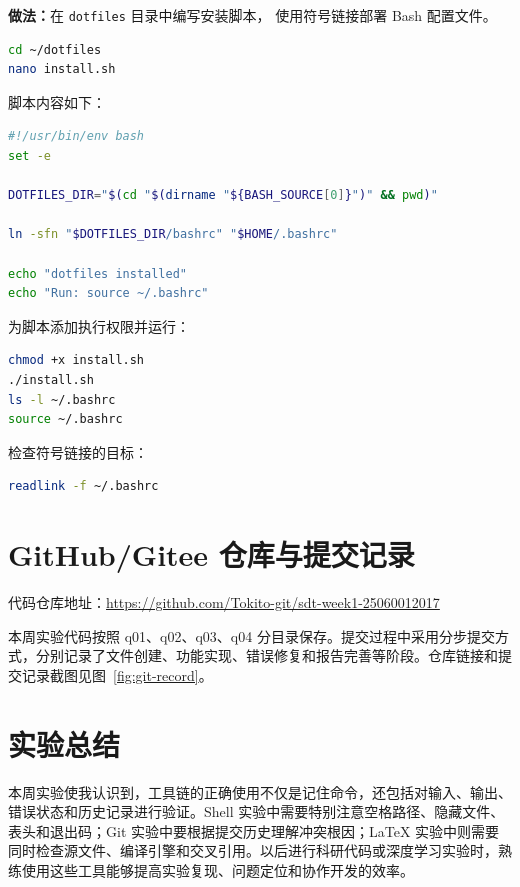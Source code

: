\documentclass[UTF8,12pt,a4paper]{ctexart}
\begin{document}
\textbf{做法：}在 \texttt{dotfiles} 目录中编写安装脚本，
使用符号链接部署 Bash 配置文件。

\begin{lstlisting}[language=bash]
cd ~/dotfiles
nano install.sh
\end{lstlisting}

脚本内容如下：

\begin{lstlisting}[language=bash]
#!/usr/bin/env bash
set -e

DOTFILES_DIR="$(cd "$(dirname "${BASH_SOURCE[0]}")" && pwd)"

ln -sfn "$DOTFILES_DIR/bashrc" "$HOME/.bashrc"

echo "dotfiles installed"
echo "Run: source ~/.bashrc"
\end{lstlisting}

为脚本添加执行权限并运行：

\begin{lstlisting}[language=bash]
chmod +x install.sh
./install.sh
ls -l ~/.bashrc
source ~/.bashrc
\end{lstlisting}

检查符号链接的目标：

\begin{lstlisting}[language=bash]
readlink -f ~/.bashrc
\end{lstlisting}

\section{GitHub/Gitee 仓库与提交记录}

代码仓库地址：\url{https://github.com/Tokito-git/sdt-week1-25060012017}

本周实验代码按照 q01、q02、q03、q04 分目录保存。提交过程中采用分步提交方式，分别记录了文件创建、功能实现、错误修复和报告完善等阶段。仓库链接和提交记录截图见图~\ref{fig:git-record}。


\section{实验总结}

本周实验使我认识到，工具链的正确使用不仅是记住命令，还包括对输入、输出、错误状态和历史记录进行验证。Shell 实验中需要特别注意空格路径、隐藏文件、表头和退出码；Git 实验中要根据提交历史理解冲突根因；LaTeX 实验中则需要同时检查源文件、编译引擎和交叉引用。以后进行科研代码或深度学习实验时，熟练使用这些工具能够提高实验复现、问题定位和协作开发的效率。
\end{document}

